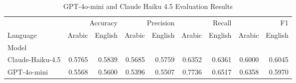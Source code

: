 \begin{table}
\caption{GPT-4o-mini and Claude Haiku 4.5 Evaluation Results}
\label{tab:llm_comparison}
\begin{tabular}{lrrrrrrrr}
\toprule
 & \multicolumn{2}{r}{Accuracy} & \multicolumn{2}{r}{Precision} & \multicolumn{2}{r}{Recall} & \multicolumn{2}{r}{F1} \\
Language & Arabic & English & Arabic & English & Arabic & English & Arabic & English \\
Model &  &  &  &  &  &  &  &  \\
\midrule
Claude-Haiku-4.5 & 0.5765 & 0.5839 & 0.5685 & 0.5759 & 0.6352 & 0.6361 & 0.6000 & 0.6045 \\
GPT-4o-mini & 0.5568 & 0.5600 & 0.5396 & 0.5507 & 0.7736 & 0.6517 & 0.6358 & 0.5970 \\
\bottomrule
\end{tabular}
\end{table}

